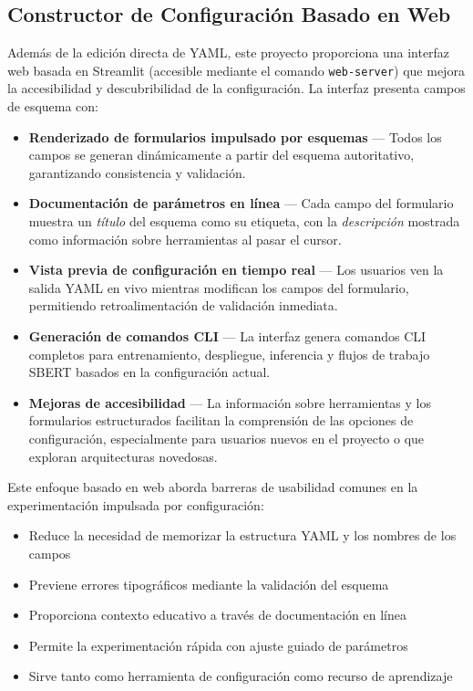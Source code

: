 \subsection{Constructor de Configuración Basado en Web}

Además de la edición directa de YAML, este proyecto proporciona una interfaz web basada en Streamlit (accesible mediante el comando \texttt{web-server}) que mejora la accesibilidad y descubribilidad de la configuración. La interfaz presenta campos de esquema con:

\begin{itemize}[leftmargin=*]
    \item \textbf{Renderizado de formularios impulsado por esquemas} --- Todos los campos se generan dinámicamente a partir del esquema autoritativo, garantizando consistencia y validación.
    \item \textbf{Documentación de parámetros en línea} --- Cada campo del formulario muestra un \emph{título} del esquema como su etiqueta, con la \emph{descripción} mostrada como información sobre herramientas al pasar el cursor.
    \item \textbf{Vista previa de configuración en tiempo real} --- Los usuarios ven la salida YAML en vivo mientras modifican los campos del formulario, permitiendo retroalimentación de validación inmediata.
    \item \textbf{Generación de comandos CLI} --- La interfaz genera comandos CLI completos para entrenamiento, despliegue, inferencia y flujos de trabajo SBERT basados en la configuración actual.
    \item \textbf{Mejoras de accesibilidad} --- La información sobre herramientas y los formularios estructurados facilitan la comprensión de las opciones de configuración, especialmente para usuarios nuevos en el proyecto o que exploran arquitecturas novedosas.
\end{itemize}

Este enfoque basado en web aborda barreras de usabilidad comunes en la experimentación impulsada por configuración:
\begin{itemize}[leftmargin=*]
    \item Reduce la necesidad de memorizar la estructura YAML y los nombres de los campos
    \item Previene errores tipográficos mediante la validación del esquema
    \item Proporciona contexto educativo a través de documentación en línea
    \item Permite la experimentación rápida con ajuste guiado de parámetros
    \item Sirve tanto como herramienta de configuración como recurso de aprendizaje
\end{itemize}

